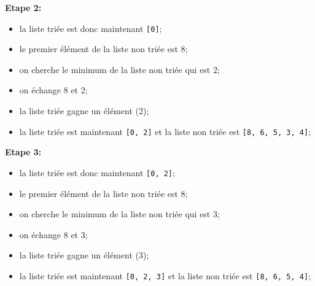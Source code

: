 \textbf{Etape 2:}


\begin{itemize}
	\item la liste triée est donc maintenant \verb|[0]|;
	\item le premier élément de la liste non triée est 8;
	\item on cherche le minimum de la liste non triée qui est 2;
	\item on échange 8 et 2;
	\item la liste triée gagne un élément (2);
	\item la liste triée est maintenant \verb|[0, 2]| et la liste non triée est \verb|[8, 6, 5, 3, 4]|;
\end{itemize}

\textbf{Etape 3:}

\begin{itemize}
	\item la liste triée est donc maintenant \verb|[0, 2]|;
	\item le premier élément de la liste non triée est 8;
	\item on cherche le minimum de la liste non triée qui est 3;
	\item on échange 8 et 3;
	\item la liste triée gagne un élément (3);
	\item la liste triée est maintenant \verb|[0, 2, 3]| et la liste non triée est \verb|[8, 6, 5, 4]|;
\end{itemize}


